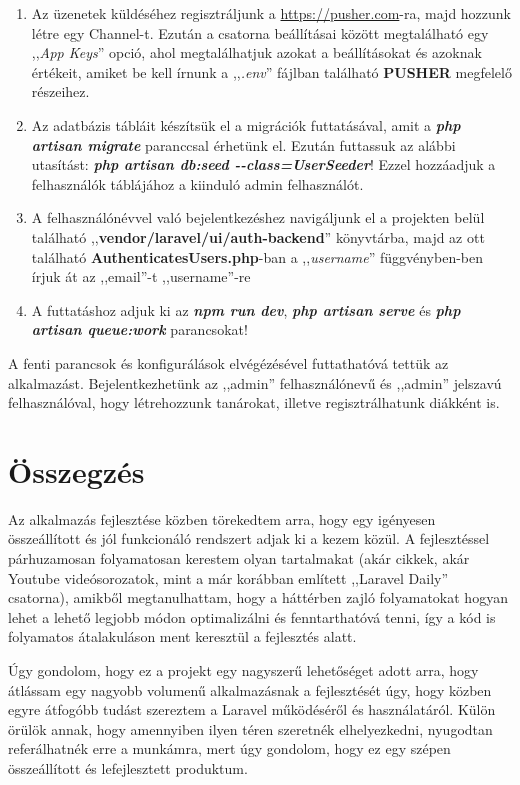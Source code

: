 \documentclass[
]{thesis-ekf}
\theoremstyle{definition}
\theoremstyle{remark}
\begin{document}
\begin{enumerate}
            \item Az üzenetek küldéséhez regisztráljunk a \url{https://pusher.com}-ra, majd hozzunk létre egy Channel-t. Ezután a csatorna beállításai között megtalálható egy ,,\emph{App Keys}'' opció, ahol megtalálhatjuk azokat a beállításokat és azoknak értékeit, amiket be kell írnunk a ,,\emph{.env}'' fájlban található \textbf{PUSHER} megfelelő részeihez.
            \item Az adatbázis tábláit készítsük el a migrációk futtatásával, amit a \emph{\textbf{php artisan migrate}} paranccsal érhetünk el. Ezután futtassuk az alábbi utasítást: \emph{\textbf{php artisan db:seed -{}-class=UserSeeder}}! Ezzel hozzáadjuk a felhasználók táblájához a kiinduló admin felhasználót.
            \item A felhasználónévvel való bejelentkezéshez navigáljunk el a projekten belül található ,,\textbf{vendor/laravel/ui/auth-backend}'' könyvtárba, majd az ott található \textbf{AuthenticatesUsers.php}-ban a ,,\emph{username}'' függvényben-ben írjuk át az ,,email''-t ,,username''-re

            \item A futtatáshoz adjuk ki az \emph{\textbf{npm run dev}}, \emph{\textbf{php artisan serve}} és \emph{\textbf{php artisan queue:work}} parancsokat!
        \end{enumerate}
        A fenti parancsok és konfigurálások elvégézésével futtathatóvá tettük az alkalmazást. Bejelentkezhetünk az ,,admin'' felhasználónevű és ,,admin'' jelszavú felhasználóval, hogy létrehozzunk tanárokat, illetve regisztrálhatunk diákként is.
        \chapter*{Összegzés}
        Az alkalmazás fejlesztése közben törekedtem arra, hogy egy igényesen összeállított és jól funkcionáló rendszert adjak ki a kezem közül. A fejlesztéssel párhuzamosan folyamatosan kerestem olyan tartalmakat (akár cikkek, akár Youtube videósorozatok, mint a már korábban említett ,,Laravel Daily'' csatorna), amikből megtanulhattam, hogy a háttérben zajló folyamatokat hogyan lehet a lehető legjobb módon optimalizálni és fenntarthatóvá tenni, így a kód is folyamatos átalakuláson ment keresztül a fejlesztés alatt. 

        Úgy gondolom, hogy ez a projekt egy nagyszerű lehetőséget adott arra, hogy átlássam egy nagyobb volumenű alkalmazásnak a fejlesztését úgy, hogy közben egyre átfogóbb tudást szereztem a Laravel működéséről és használatáról. Külön örülök annak, hogy amennyiben ilyen téren szeretnék elhelyezkedni, nyugodtan referálhatnék erre a munkámra, mert úgy gondolom, hogy ez egy szépen összeállított és lefejlesztett produktum.
    
\end{document}
